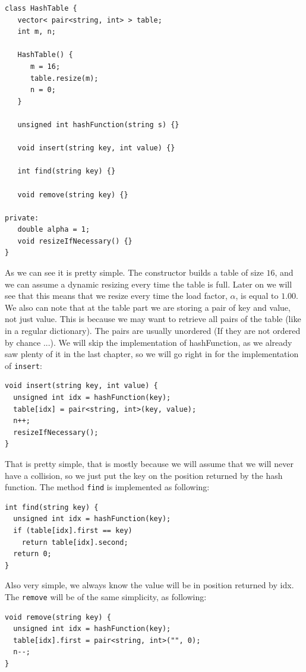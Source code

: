 \begin{lstlisting}
class HashTable {
   vector< pair<string, int> > table;
   int m, n;
   
   HashTable() {
      m = 16;
      table.resize(m);
      n = 0;
   }

   unsigned int hashFunction(string s) {}
   
   void insert(string key, int value) {}

   int find(string key) {}

   void remove(string key) {}

private:
   double alpha = 1;
   void resizeIfNecessary() {}
}
\end{lstlisting}

As we can see it is pretty simple. The constructor builds a table of size \( 16 \), and we can assume a dynamic resizing every time the table is full. Later on we will see that this means that we resize every time the load factor, \( \alpha \), is equal to \( 1.00 \). We also can note that at the table part we are storing a pair of key and value, not just value. This is because we may want to retrieve all pairs of the table (like in a regular dictionary). The pairs are usually unordered (If they are not ordered by chance ...). We will skip the implementation of hashFunction, as we already saw plenty of it in the last chapter, so we will go right in for the implementation of \texttt{insert}:

\begin{lstlisting}
void insert(string key, int value) {
  unsigned int idx = hashFunction(key);
  table[idx] = pair<string, int>(key, value);
  n++;
  resizeIfNecessary();
}
\end{lstlisting}

That is pretty simple, that is mostly because we will assume that we will never have a collision, so we just put the key on the position returned by the hash function. The method \texttt{find} is implemented as following:

\begin{lstlisting}
int find(string key) {
  unsigned int idx = hashFunction(key);
  if (table[idx].first == key)
    return table[idx].second;
  return 0;
}
\end{lstlisting}

Also very simple, we always know the value will be in position returned by idx. The \texttt{remove} will be of the same simplicity, as following:

\begin{lstlisting}
void remove(string key) {
  unsigned int idx = hashFunction(key);
  table[idx].first = pair<string, int>("", 0);
  n--;
}
\end{lstlisting}

